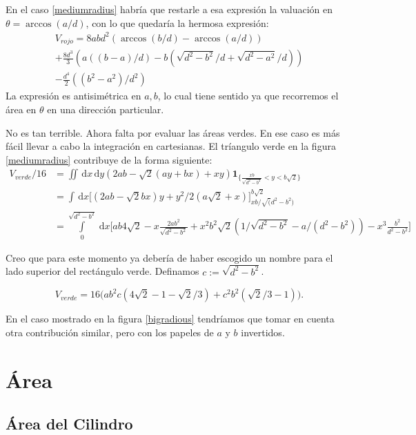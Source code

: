 \documentclass[a4paper,10pt]{article}
\newcommand{\rd}{\, \mathrm{d}}
\newcommand{\indicator}[1]{\mathbf{1}_{ \{   #1 \} } }
\begin{document}
En el caso \ref{mediumradius} habría que restarle a esa expresión
la valuación en $\theta=\arccos(a/d)$, con lo que quedaría la hermosa 
expresión:
\begin{multline}
V_{rojo} = 8abd^2(\arccos(b/d)-\arccos(a/d))\\
+\frac{8 d^3}{3 }(a((b-a)/d)-b(\sqrt{d^2-b^2}/d+\sqrt{d^2-a^2}/d))\\
-\frac{d^4}{2} ( (b^2-a^2)/d^2) 
\end{multline}
La expresión es antisimétrica en $a,b$, lo cual tiene sentido ya
que recorremos el área en $\theta$ en una dirección particular.

No es tan terrible. Ahora falta por evaluar las áreas verdes. 
En ese caso es más fácil llevar a cabo la integración
en cartesianas. El tríangulo verde en la figura \ref{mediumradius}
contribuye de la forma siguiente:
\begin{equation}
\begin{split}
V_{verde}/16 & = \iint  \rd x \rd y (2ab-\sqrt{2}(ay+bx)+x y)
\indicator{\frac{xb}{\sqrt{d^2-b^2}}< y < b\sqrt{2}}\\
&=\int \rd x \bigg[ (2ab-\sqrt{2} b x) y+ y^2/2 (a \sqrt{2}+x) \bigg]
_{xb/\sqrt(d^2-b^2)}^{b\sqrt{2}} \\
&=\int \limits_0 ^{\sqrt{d^2-b^2}} \rd x 
\bigg[ab 4\sqrt{2}
-x\frac{2ab^2}{\sqrt{d^2-b^2}}
+x^2b^2\sqrt{2}(1/\sqrt{d^2-b^2}-a/(d^2-b^2))-x^3\frac{b^2}{d^2-b^2}
\bigg]
\end{split}
\end{equation}

Creo que para este momento ya debería de haber escogido un nombre
para el lado superior del rectángulo verde. Definamos
$c:=\sqrt{d^2-b^2}$.

\begin{equation}
V_{verde}=16\big( a b^2 c (4\sqrt{2}-1-\sqrt{2}/3)
+c^2b^2 (\sqrt{2}/3-1) \big).
\end{equation}

En el caso mostrado en la  figura \ref{bigradious} tendríamos
que tomar en cuenta otra contribución similar, pero con
los papeles de $a$ y $b$ invertidos. 

\section{Área}

\subsection{Área del Cilindro}
\end{document}

